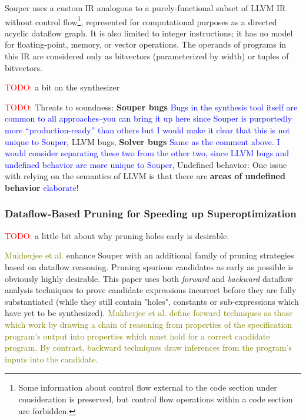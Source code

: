 \documentclass[12pt,twoside]{reedthesis}
\newcommand{\red}[1]{\textcolor{red}{#1}}
\newcommand{\green}[1]{\textcolor{olive}{#1}}
\newcommand{\comment}[2]{\textbf{#1} \textcolor{blue}{#2}}
\newcommand{\addressed}[2]{{#1}}
\begin{document}
Souper uses a custom IR analogous to a purely-functional subset of LLVM IR without control flow\footnote{Some information about control flow external to the code section under consideration is preserved, but control flow operations within a code section are forbidden.}, represented for computational purposes as a directed acyclic dataflow graph.
It is also limited to integer instructions; it has no model for floating-point, memory, or vector operations.
The operands of programs in this IR are considered only as bitvectors (parameterized by width) or tuples of bitvectors.
    
    \red{TODO:} a bit on the synthesizer
    
    \red{TODO}: Threats to soundness:
        \comment{Souper bugs}{Bugs in the synthesis tool itself are common to all approaches--you can bring it up here since Souper is purportedly more ``production-ready'' than others but I would make it clear that this is not unique to Souper},
        LLVM bugs,
        \comment{Solver bugs}{Same as the comment above. I would consider separating these two from the other two, since LLVM bugs and undefined behavior are more unique to Souper},
        Undefined behavior: One issue with relying on the semantics of LLVM is that there are \comment{areas of undefined behavior}{elaborate}!

\subsubsection{Dataflow-Based Pruning for Speeding up Superoptimization}
    \red{TODO:} a little bit about why pruning holes early is desirable.

\green{Mukherjee et al.} \cite{mukherjee2020dataflow} enhance Souper with an additional family of pruning strategies based on dataflow reasoning. 
Pruning spurious candidates as early as possible is obviously highly desirable.
This paper uses both \textit{forward} and \textit{backward} dataflow analysis techniques to prove candidate expressions incorrect before they are fully substantiated (while they still contain "holes", constants or sub-expressions which have yet to be synthesized).
\green{
Mukherjee et al. define forward techniques as those which work by drawing a chain of reasoning from properties of the specification program's output into properties which must hold for a correct candidate program.
By contrast, backward techniques draw inferences from the program's inputs into the candidate.
}
\end{document}
